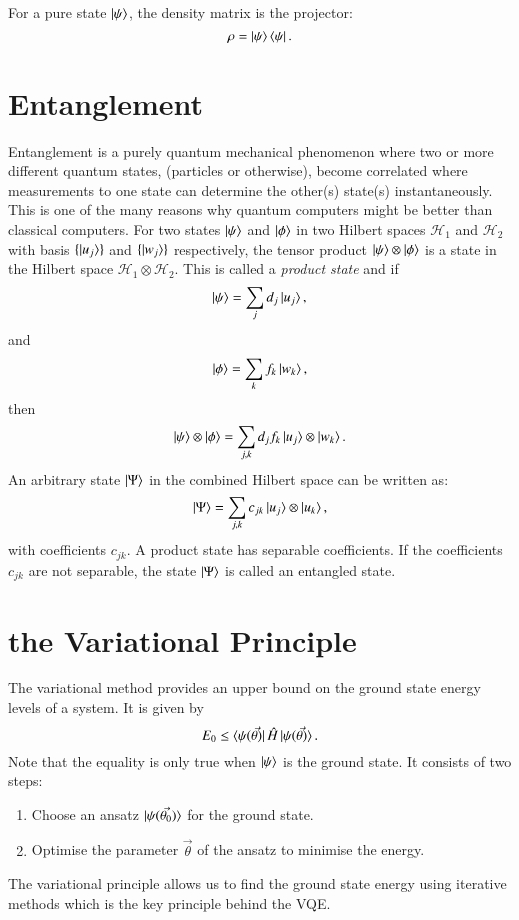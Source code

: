 For a pure state $ \ket{\psi} $, the density matrix is the projector:
\begin{equation}
	\rho = \ket{\psi}\bra{\psi}.
\end{equation}

\section{Entanglement}
\label{sec:entanglement}
Entanglement is a purely quantum mechanical phenomenon where two or more different quantum states, (particles or otherwise), become correlated where measurements to one state can determine the other(s) state(s) instantaneously. This is one of the many reasons why quantum computers might be better than classical computers.
For two states $ \ket{\psi}  $ and $ \ket{\phi} $ in two Hilbert spaces $ \mathcal{H}_1 $ and $ \mathcal{H}_2 $ with basis $ \{\ket{u_j} \} $ and $ \{\ket{w_j} \} $  respectively, the tensor product $ \ket{\psi} \otimes \ket{\phi} $ is a state in the Hilbert space $ \mathcal{H}_1 \otimes \mathcal{H}_2 $. This is called a \textit{product state} and if
\[ \ket{\psi} = \sum_j d_j \ket{u_j},\] and \[ \ket{\phi} = \sum_k f_k \ket{w_k},\] 
then
\[ \ket{\psi} \otimes \ket{\phi} = \sum_{j,k} d_j f_k \ket{u_j} \otimes \ket{w_k}.\]
An arbitrary state $ \ket{\Psi} $ in the combined Hilbert space can be written as:
\[ \ket{\Psi} = \sum_{j,k} c_{jk} \ket{u_j} \otimes \ket{u_k}, \] 
with coefficients $ c_{jk} $.
A product state has separable coefficients. If the coefficients $ c_{jk} $  are not separable, the state $ \ket{\Psi} $ is called an entangled state. 

\section{the Variational Principle}
\label{sec:variational_principle}
The variational method provides an upper bound on the ground state energy levels of a system. It is given by
\begin{equation}
	\label{eq:variational_principle}
	E_0 \leq \bra{\psi(\vec{\theta)}} \hat H \ket{\psi(\vec{\theta)}}.
\end{equation}
Note that the equality is only true when $\ket{\psi}$ is the ground state.
It consists of two steps:
\begin{enumerate}
	\item Choose an ansatz $\ket{\psi(\vec{\theta_0})}$ for the ground state.
	\item Optimise the parameter $\vec{\theta}$ of the ansatz to minimise the energy.
\end{enumerate}
The variational principle allows us to find the ground state energy using iterative methods which is the key principle behind the VQE. 



